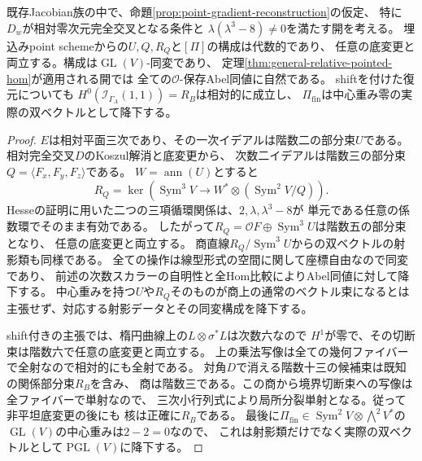 \begin{proposition}[復元の相対性とAbel同値への自然性]
\label{prop:point-recovery-relative-descent}
既存Jacobian族の中で、命題\ref{prop:point-gradient-reconstruction}の仮定、
特に$D_w$が相対零次元完全交叉となる条件と
$\lambda(\lambda^3-8)\ne0$を満たす開を考える。
埋込みpoint schemeからの$U,Q,R_Q$と$[\Pi]$の構成は代数的であり、
任意の底変更と両立する。構成は$\operatorname{GL}(V)$-同変であり、
定理\ref{thm:general-relative-pointed-hom}が適用される開では
全ての$\mathcal O$-保存Abel同値に自然である。
shiftを付けた復元についても
$H^0(\mathcal I_{\Gamma_A}(1,1))=R_B$は相対的に成立し、
$\Pi_{\mathrm{fin}}$は中心重み零の実際の双ベクトルとして降下する。
\end{proposition}
\begin{proof}
$E$は相対平面三次であり、その一次イデアルは階数二の部分束$U$である。
相対完全交叉$D$のKoszul解消と底変更から、
次数二イデアルは階数三の部分束$Q=\langle F_x,F_y,F_z\rangle$である。
$W=\operatorname{ann}(U)$とすると
\[
 R_Q=\ker\left(\operatorname{Sym}^3V\longrightarrow
 W^*\otimes(\operatorname{Sym}^2V/Q)\right).
\]
Hesseの証明に用いた二つの三項循環関係は、$2,\lambda,\lambda^3-8$が
単元である任意の係数環でそのまま有効である。
したがって$R_Q=\mathcal O F\oplus\operatorname{Sym}^3U$は階数五の部分束となり、
任意の底変更と両立する。
商直線$R_Q/\operatorname{Sym}^3U$からの双ベクトルの射影類も同様である。
全ての操作は線型形式の空間に関して座標自由なので同変であり、
前述の次数スカラーの自明性と全Hom比較によりAbel同値に対して降下する。
中心重みを持つ$U$や$R_Q$そのものが商上の通常のベクトル束になるとは
主張せず、対応する射影データとその同変構成を降下する。

shift付きの主張では、楕円曲線上の$L\otimes\sigma^*L$は次数六なので
$H^1$が零で、その切断束は階数六で任意の底変更と両立する。
上の乗法写像は全ての幾何ファイバーで全射なので相対的にも全射である。
対角$D$で消える階数十三の候補束は既知の関係部分束$R_B$を含み、
商は階数三である。この商から境界切断束への写像は全ファイバーで単射なので、
三次小行列式により局所分裂単射となる。従って非平坦底変更の後にも
核は正確に$R_B$である。
最後に$\Pi_{\mathrm{fin}}\in\operatorname{Sym}^2V\otimes\bigwedge^2V^*$の
$\operatorname{GL}(V)$の中心重みは$2-2=0$なので、
これは射影類だけでなく実際の双ベクトルとして$\operatorname{PGL}(V)$に降下する。
\end{proof}


